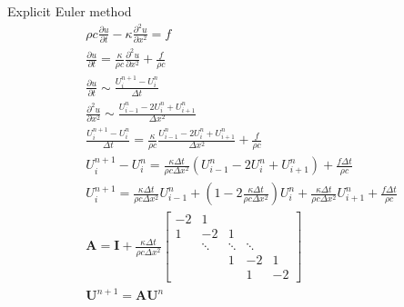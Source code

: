 \documentclass[a4paper,10pt]{article}
\begin{document}
Explicit Euler method
\begin{align*}
& \rho c \frac{\partial u}{\partial t} - \kappa \frac{\partial ^2 u}{\partial x^2} = f \\
& \frac{\partial u}{\partial t} = \frac{\kappa}{\rho c} \frac{\partial ^2 u}{\partial x^2} + \frac{f}{\rho c} \\
& \frac{\partial u}{\partial t} \sim \frac{U_i^{n+1} - U_i^n}{\Delta t} \\
& \frac{\partial ^2 u}{\partial x^2} \sim \frac{U_{i-1}^n - 2 U_i^n + U_{i+1}^n}{\Delta x^2} \\
& \frac{U_i^{n+1} - U_i^n}{\Delta t} = \frac{\kappa}{\rho c} \frac{U_{i-1}^n - 2 U_i^n + U_{i+1}^n}{\Delta x^2} + \frac{f}{\rho c} \\
& U_i^{n+1} - U_i^n = \frac{\kappa \Delta t}{\rho c \Delta x^2} ( U_{i-1}^n - 2 U_i^n + U_{i+1}^n ) + \frac{f \Delta t}{\rho c} \\
& U_i^{n+1} = \frac{\kappa \Delta t}{\rho c \Delta x^2} U_{i-1}^n + ( 1 - 2 \frac{\kappa \Delta t}{\rho c \Delta x^2} ) U_i^n + \frac{\kappa \Delta t}{\rho c \Delta x^2} U_{i+1}^n + \frac{f \Delta t}{\rho c} \\
& \bm A = \bm I + \frac{\kappa \Delta t}{\rho c \Delta x^2}
\begin{bmatrix}
-2 & 1  & \  & \  & \  \\
1  & -2 & 1  & \  & \  \\
\  & \ddots & \ddots & \ddots & \ \\
\  & \  & 1  & -2 & 1  \\
\  & \  & \  & 1  & -2 
\end{bmatrix} \\
& \bm U^{n+1} = \bm A \bm U^n
\end{align*}
\end{document}
